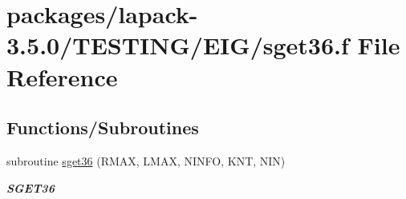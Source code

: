 \hypertarget{sget36_8f}{}\section{packages/lapack-\/3.5.0/\+T\+E\+S\+T\+I\+N\+G/\+E\+I\+G/sget36.f File Reference}
\label{sget36_8f}
\subsection*{Functions/\+Subroutines}
\begin{DoxyCompactItemize}
\item 
subroutine \hyperlink{group__single__eig_ga142bffda1c42659908f951ac51744638}{sget36} (R\+M\+A\+X, L\+M\+A\+X, N\+I\+N\+F\+O, K\+N\+T, N\+I\+N)
\begin{DoxyCompactList}\small\item\em {\bfseries S\+G\+E\+T36} \end{DoxyCompactList}\end{DoxyCompactItemize}
